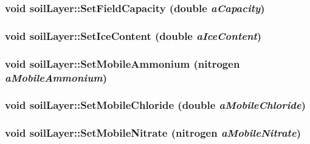 \label{classsoil_layer_ac58f88c6110ed8e40e12dd469fca7600}
\hypertarget{classsoil_layer_a3483f1af86de1d9478d2d68d671ef622}{
\subsubsection[{SetFieldCapacity}]{\setlength{\rightskip}{0pt plus 5cm}void soilLayer::SetFieldCapacity (double {\em aCapacity})}}
\label{classsoil_layer_a3483f1af86de1d9478d2d68d671ef622}
\hypertarget{classsoil_layer_a1f943c69c9e19526aa5e7e8ef11503fa}{
\subsubsection[{SetIceContent}]{\setlength{\rightskip}{0pt plus 5cm}void soilLayer::SetIceContent (double {\em aIceContent})}}
\label{classsoil_layer_a1f943c69c9e19526aa5e7e8ef11503fa}
\hypertarget{classsoil_layer_ad9bd5250fd7e8c9b22c33c0b619d4cc6}{
\subsubsection[{SetMobileAmmonium}]{\setlength{\rightskip}{0pt plus 5cm}void soilLayer::SetMobileAmmonium ({\bf nitrogen} {\em aMobileAmmonium})}}
\label{classsoil_layer_ad9bd5250fd7e8c9b22c33c0b619d4cc6}
\hypertarget{classsoil_layer_a89720f6c433431218ca16b7ab1463bf5}{
\subsubsection[{SetMobileChloride}]{\setlength{\rightskip}{0pt plus 5cm}void soilLayer::SetMobileChloride (double {\em aMobileChloride})}}
\label{classsoil_layer_a89720f6c433431218ca16b7ab1463bf5}
\hypertarget{classsoil_layer_a71a3ce45c63d49c19234d3223b8690af}{
\subsubsection[{SetMobileNitrate}]{\setlength{\rightskip}{0pt plus 5cm}void soilLayer::SetMobileNitrate ({\bf nitrogen} {\em aMobileNitrate})}}

